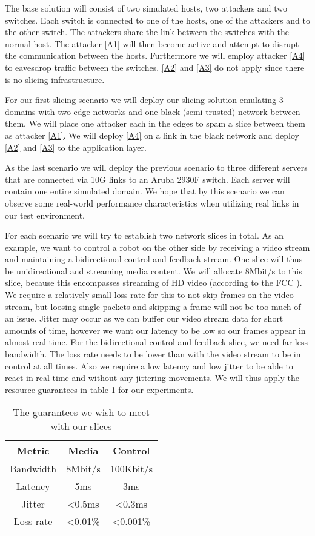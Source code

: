 The base solution will consist of two simulated hosts, two attackers and two switches. Each switch is connected to one of the hosts, one of the attackers and to the other switch. The attackers share the link between the switches with the normal host. The attacker \ref{A1} will then become active and attempt to disrupt the communication between the hosts. Furthermore we will employ attacker \ref{A4} to eavesdrop traffic between the switches. \ref{A2} and \ref{A3} do not apply since there is no slicing infrastructure.

For our first slicing scenario we will deploy our slicing solution emulating 3 domains with two edge networks and one black (semi-trusted) network between them. We will place one attacker each in the edges to spam a slice between them as attacker \ref{A1}. We will deploy \ref{A4} on a link in the black network and deploy \ref{A2} and \ref{A3} to the application layer.

As the last scenario we will deploy the previous scenario to three different servers that are connected via 10G links to an Aruba 2930F switch. Each server will contain one entire simulated domain. We hope that by this scenario we can observe some real-world performance characteristics when utilizing real links in our test environment.

For each scenario we will try to establish two network slices in total. As an example, we want to control a robot on the other side by receiving a video stream and maintaining a bidirectional control and feedback stream. One slice will thus be unidirectional and streaming media content. We will allocate 8Mbit/s to this slice, because this encompasses streaming of HD video (according to the FCC \cite{fcc}). We require a relatively small loss rate for this to not skip frames on the video stream, but loosing single packets and skipping a frame will not be too much of an issue. Jitter may occur as we can buffer our video stream data for short amounts of time, however we want our latency to be low so our frames appear in almost real time. For the bidirectional control and feedback slice, we need far less bandwidth. The loss rate needs to be lower than with the video stream to be in control at all times. Also we require a low latency and low jitter to be able to react in real time and without any jittering movements. We will thus apply the resource guarantees in table \ref{table:1} for our experiments.

\begin{table}[ht]
    \centering
    \begin{tabular}{ |c|c|c| }
    \hline
    Metric & Media & Control \\
    \hline
         Bandwidth & 8Mbit/s & 100Kbit/s \\
         Latency   & 5ms     & 3ms      \\
         Jitter    & \textless 0.5ms  & \textless 0.3ms   \\
         Loss rate & \textless 0.01\% & \textless 0.001\% \\
    \hline
    \end{tabular}
    \caption{The guarantees we wish to meet with our slices}
    \label{table:1}
\end{table}

